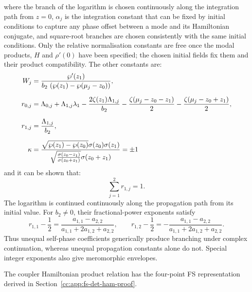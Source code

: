 \documentclass[11pt,a4paper]{article}
\begin{document}
where the branch of the logarithm is chosen continuously along the integration path from $z=0$, $\alpha_j$ is the integration constant that can be fixed by initial conditions to capture any phase offset between a mode and its Hamiltonian conjugate, and square-root branches are chosen consistently with the same initial conditions.
Only the relative normalisation constants are free once the modal products, $H$ and $\rho'(0)$ have been specified; the chosen initial fields fix them and their product compatibility.
The other constants are:
\begin{align}
W_j &= \frac{\wp'{\left(z_{1} \right)}}{b_2\,\left(\wp{\left(z_{1} \right)} - \wp{\left({\mu}_{j} - z_{0}\right)}\right)}, \notag \\[6pt]
r_{0,j} &= {\Lambda}_{0,j} + {\Lambda}_{1,j} {\lambda}_{1} - \frac{2 \zeta{\left(z_{1} \right)} {\Lambda}_{1,j}}{b_2} - \frac{\zeta{\left({\mu}_{j} - z_{0} - z_{1}\right)}}{2} - \frac{\zeta{\left({\mu}_{j} - z_{0} + z_{1}\right)}}{2}, \notag \\[6pt]
r_{1,j} &= \frac{{\Lambda}_{1,j}}{b_2}, \notag \\[6pt]
\kappa &= \frac{\sqrt{\wp{\left(z_{1}\right)} - \wp{\left(z_{0}\right)}} \sigma{\left(z_{0}\right)} \sigma{\left(z_{1}\right)}}{\sqrt{\frac{\sigma{\left(z_{0} - z_{1}\right)}}{\sigma{\left(z_{0} + z_{1}\right)}}} \sigma{\left(z_{0} + z_{1}\right)}} = \pm 1
\end{align}
and it can be shown that:
\begin{equation}
  \sum_{j=1}^{2}r_{1,j} = 1. \label{cc:eq:r1j-sum}
\end{equation}
The logarithm is continued continuously along the propagation path from its initial value.
For $b_2\ne0$, their fractional-power exponents satisfy
\begin{equation}
r_{1,1}-\frac12=\frac{a_{1,1}-a_{2,2}}{a_{1,1}+2a_{1,2}+a_{2,2}},\qquad
r_{1,2}-\frac12=-\frac{a_{1,1}-a_{2,2}}{a_{1,1}+2a_{1,2}+a_{2,2}}.
\label{cc:eq:branch-asymmetry}
\end{equation}
Thus unequal self-phase coefficients generically produce branching under complex continuation, whereas unequal propagation constants alone do not.
Special integer exponents also give meromorphic envelopes.

The coupler Hamiltonian product relation has the four-point FS representation derived in Section~\ref{cc:app:fs-det-ham-proof}.
\end{document}

